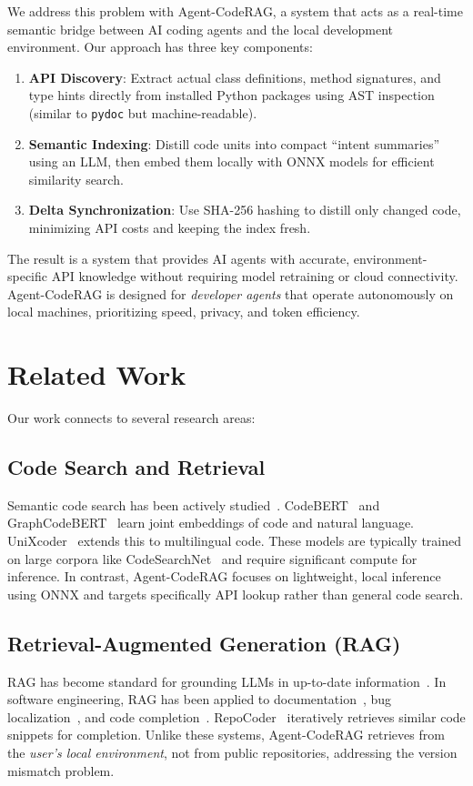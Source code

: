 \documentclass[10pt,twocolumn]{article}
\begin{document}
We address this problem with Agent-CodeRAG, a system that acts as a real-time semantic bridge between AI coding agents and the local development environment. Our approach has three key components:

\begin{enumerate}
    \item \textbf{API Discovery}: Extract actual class definitions, method signatures, and type hints directly from installed Python packages using AST inspection (similar to \texttt{pydoc} but machine-readable).
    \item \textbf{Semantic Indexing}: Distill code units into compact ``intent summaries'' using an LLM, then embed them locally with ONNX models for efficient similarity search.
    \item \textbf{Delta Synchronization}: Use SHA-256 hashing to distill only changed code, minimizing API costs and keeping the index fresh.
\end{enumerate}

The result is a system that provides AI agents with accurate, environment-specific API knowledge without requiring model retraining or cloud connectivity. Agent-CodeRAG is designed for \textit{developer agents} that operate autonomously on local machines, prioritizing speed, privacy, and token efficiency.

\section{Related Work}
\label{sec:related}

Our work connects to several research areas:

\subsection{Code Search and Retrieval}
Semantic code search has been actively studied~\citep{gu2018deep, husain2019codesearchnet}. CodeBERT~\citep{feng2020codebert} and GraphCodeBERT~\citep{guo2020graphcodebert} learn joint embeddings of code and natural language. UniXcoder~\citep{guo2022unixcoder} extends this to multilingual code. These models are typically trained on large corpora like CodeSearchNet~\citep{husain2019codesearchnet} and require significant compute for inference. In contrast, Agent-CodeRAG focuses on lightweight, local inference using ONNX and targets specifically API lookup rather than general code search.

\subsection{Retrieval-Augmented Generation (RAG)}
RAG has become standard for grounding LLMs in up-to-date information~\citep{lewis2020retrieval}. In software engineering, RAG has been applied to documentation~\citep{pan2023retrieval}, bug localization~\citep{lu2022graph}, and code completion~\citep{zhang2022repocoder}. RepoCoder~\citep{zhang2022repocoder} iteratively retrieves similar code snippets for completion. Unlike these systems, Agent-CodeRAG retrieves from the \textit{user's local environment}, not from public repositories, addressing the version mismatch problem.
\end{document}
